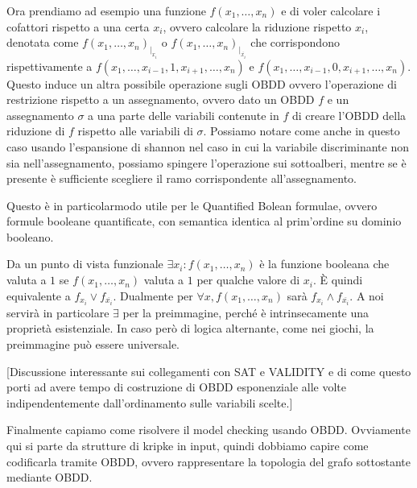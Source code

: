 Ora prendiamo ad esempio una funzione \(f(x_1,\ldots,x_n)\) e di voler calcolare i cofattori rispetto a una certa \(x_i\), ovvero calcolare la riduzione rispetto \(x_i\), denotata come \(f(x_1,\ldots,x_n)_{|_{x_i}}\) o \(f(x_1,\ldots,x_n)_{|_{\overline{x_i}}}\) che corrispondono rispettivamente a \(f(x_1,\ldots,x_{i-1}, 1, x_{i+1},\ldots,x_n)\) e \(f(x_1,\ldots,x_{i-1}, 0, x_{i+1},\ldots,x_n)\). Questo induce un altra possibile operazione sugli OBDD ovvero l'operazione di restrizione rispetto a un assegnamento, ovvero dato un OBDD \(f\) e un assegnamento \(\sigma\) a una parte delle variabili contenute in \(f\) di creare l'OBDD della riduzione di \(f\) rispetto alle variabili di \(\sigma\). Possiamo notare come anche in questo caso usando l'espansione di shannon nel caso in cui la variabile discriminante non sia nell'assegnamento, possiamo spingere l'operazione sui sottoalberi, mentre se è presente è sufficiente scegliere il ramo corrispondente all'assegnamento.

Questo è in particolarmodo utile per le Quantified Bolean formulae, ovvero formule booleane quantificate, con semantica identica al prim'ordine su dominio booleano.

Da un punto di vista funzionale \(\exists x_i:f(x_1, \ldots, x_n)\) è la funzione booleana che valuta a \(1\) se \(f(x_1, \ldots,x_n)\) valuta a \(1\) per qualche valore di \(x_i\). È quindi equivalente a \(f_{x_i} \lor f_{\overline{x_i}}\). Dualmente per \(\forall x, f(x_1, \ldots, x_n)\) sarà \(f_{x_i} \land f_{\overline{x_i}}\). A noi servirà in particolare \(\exists\) per la preimmagine, perché è intrinsecamente una proprietà esistenziale. In caso però di logica alternante, come nei giochi, la preimmagine può essere universale.

[Discussione interessante sui collegamenti con SAT e VALIDITY e di come questo porti ad avere tempo di costruzione di OBDD esponenziale alle volte indipendentemente dall'ordinamento sulle variabili scelte.]

Finalmente capiamo come risolvere il model checking usando OBDD. Ovviamente qui si parte da strutture di kripke in input, quindi dobbiamo capire come codificarla tramite OBDD, ovvero rappresentare la topologia del grafo sottostante mediante OBDD.

